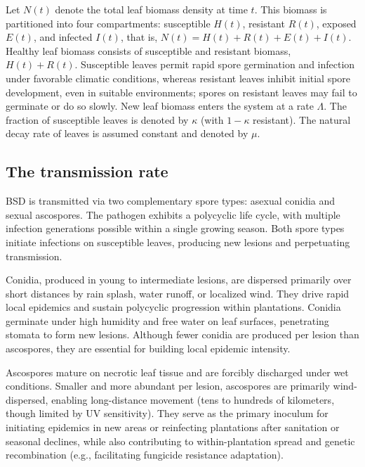 \documentclass[11pt]{article}
\numberwithin{equation}{section}
\begin{document}
Let $N(t)$ denote the total leaf biomass density at time $t$. This biomass is partitioned into four compartments: susceptible $H(t)$, resistant $R(t)$, exposed $E(t)$, and infected $I(t)$, that is, $N(t)= H(t) + R(t) + E(t) + I(t)$. Healthy leaf biomass consists of susceptible and resistant biomass, $H(t) + R(t)$. Susceptible leaves permit rapid spore germination and infection under favorable climatic conditions, whereas resistant leaves inhibit initial spore development, even in suitable environments; spores on resistant leaves may fail to germinate or do so slowly.
New leaf biomass enters the system at a rate $\Lambda$. The fraction of susceptible leaves is denoted by $\kappa$ (with $1 - \kappa$ resistant). The natural decay rate of leaves is assumed constant and denoted by $\mu$.

\subsection{The transmission rate}
BSD is transmitted via two complementary spore types: asexual conidia and sexual ascospores. The pathogen exhibits a polycyclic life cycle, with multiple infection generations possible within a single growing season. Both spore types initiate infections on susceptible leaves, producing new lesions and perpetuating transmission.

Conidia, produced in young to intermediate lesions, are dispersed primarily over short distances by rain splash, water runoff, or localized wind. They drive rapid local epidemics and sustain polycyclic progression within plantations. Conidia germinate under high humidity and free water on leaf surfaces, penetrating stomata to form new lesions. Although fewer conidia are produced per lesion than ascospores, they are essential for building local epidemic intensity.

Ascospores mature on necrotic leaf tissue and are forcibly discharged under wet conditions. Smaller and more abundant per lesion, ascospores are primarily wind-dispersed, enabling long-distance movement (tens to hundreds of kilometers, though limited by UV sensitivity). They serve as the primary inoculum for initiating epidemics in new areas or reinfecting plantations after sanitation or seasonal declines, while also contributing to within-plantation spread and genetic recombination (e.g., facilitating fungicide resistance adaptation).
\end{document}
